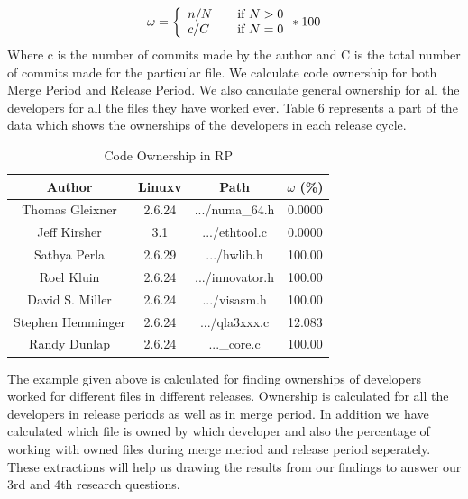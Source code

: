 \documentclass{acm_proc_article-sp}
\begin{document}
\begin{equation} \omega = \left\{ \begin{array}{l l} n/N & \quad \text{if $N > 0$}\\ c/C & \quad \text{if $N = 0$} \end{array} * 100 \right.\end{equation}
Where c is the number of commits made by the author and C is the total number of commits made for the particular file.
We calculate code ownership for both Merge Period and Release Period. We also canculate general ownership for all the developers for all the files they have worked ever. Table 6 represents a part of the data which shows the ownerships of the developers in each release cycle.

\begin{table}[ht]
\caption{Code Ownership in RP}  %
\centering 						%
\begin{tabular}{c c c c}				%
\hline\hline						%
Author 				& Linuxv		& Path				& $\omega$ (\%) \\ [0.5ex]
\hline 							%
Thomas Gleixner		& 2.6.24		& .../numa\_64.h	& 0.0000\\
Jeff Kirsher			& 3.1		& .../ethtool.c		& 0.0000\\
Sathya Perla			& 2.6.29		& .../hwlib.h		& 100.00\\
Roel Kluin			& 2.6.24		& .../innovator.h 	& 100.00\\
David S. Miller		& 2.6.24		& .../visasm.h 		& 100.00\\
Stephen Hemminger	& 2.6.24		& .../qla3xxx.c	 	& 12.083\\
Randy Dunlap			& 2.6.24		& ...\_core.c 		& 100.00\\
[1ex]							%
\hline 							%
\end{tabular}
\label{table:nonlin} 				%
\end{table}
The example given above is calculated for finding ownerships of developers worked for different files in different releases. Ownership is calculated for all the developers in release periods as well as in merge period. In addition we have calculated which file is owned by which developer and also the percentage of working with owned files during merge meriod and release period seperately. These extractions will help us drawing the results from our findings to answer our 3rd and 4th research questions.
\end{document}
